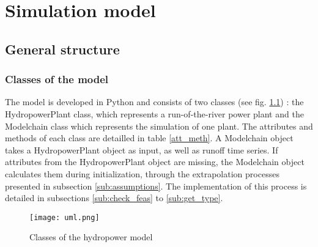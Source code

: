 \chapter{Simulation model}
\label{chap:simulation_model}

\section{General structure}

\subsection{Classes of the model}
The model is developed in Python and consists of two classes (see fig. \ref{uml}) : the HydropowerPlant class, which represents a run-of-the-river power plant and the Modelchain class which represents the simulation of one plant. The attributes and methods of each class are detailled in table \ref{att_meth}. \newline
A Modelchain object takes a HydropowerPlant object as input, as well as runoff time series. If attributes from the HydropowerPlant object are missing, the Modelchain object calculates them during initialization, through the extrapolation processes presented in subsection \ref{sub:assumptions}. The implementation of this process is detailed in subsections \ref{sub:check_feas} to \ref{sub:get_type}.
\begin{figure}[H]
\centering
\texttt{[image: uml.png]}
\caption{Classes of the hydropower model}
\label{uml}
\end{figure}

